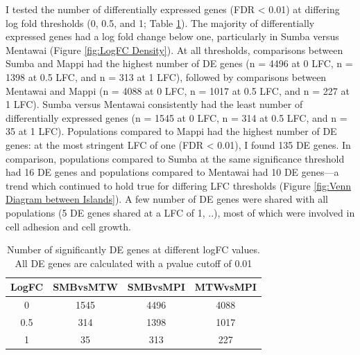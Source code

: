 \documentclass[12pt,a4paper,titlepage,twoside,openright]{book}
\begin{document}
\begin{mainmatter}
{{I tested the number of differentially expressed genes (FDR < 0.01) at differing log fold thresholds (0, 0.5, and 1; Table \ref{table:LogFC Thresholds}). The majority of differentially expressed genes had a log fold change below one, particularly in Sumba versus Mentawai (Figure \ref{fig:LogFC Density}). At all thresholds, comparisons between Sumba and Mappi had the highest number of DE genes (n = 4496 at 0 LFC, n = 1398 at 0.5 LFC, and n = 313 at 1 LFC), followed by comparisons between Mentawai and Mappi (n = 4088 at 0 LFC, n = 1017 at 0.5 LFC, and n = 227 at 1 LFC). Sumba versus Mentawai consistently had the least number of differentially expressed genes (n = 1545 at 0 LFC, n = 314 at 0.5 LFC, and n = 35 at 1 LFC). Populations compared to Mappi had the highest number of DE genes: at the most stringent LFC of one (FDR < 0.01), I found 135 DE genes. In comparison, populations compared to Sumba at the same significance threshold had 16 DE genes and populations compared to Mentawai had 10 DE genes---a trend which continued to hold true for differing LFC thresholds (Figure \ref{fig:Venn Diagram between Islands}). A few number of DE genes were shared with all populations (5 DE genes shared at a LFC of 1, ..), most of which were involved in cell adhesion and cell growth. 

\begin{table}[htb!]
\caption{Number of significantly DE genes at different logFC values. All DE genes are calculated with a pvalue cutoff of 0.01}
\centering
\begin{tabular}{c c c c}
\hline\hline 
LogFC & SMBvsMTW & SMBvsMPI & MTWvsMPI \\ [0.5ex] 
\hline
0 & 1545 & 4496 & 4088 \\ 
\hline
0.5 & 314 & 1398 & 1017 \\
\hline
1 & 35 & 313 & 227 \\
\hline
\end{tabular}
\label{table:LogFC Thresholds}
\end{table}

}}
\end{mainmatter}
\end{document}

